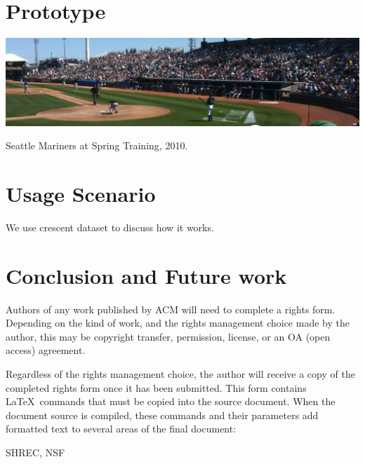 \documentclass[manuscript,screen]{acmart}
\begin{document}
\section{Prototype}

\begin{teaserfigure}
  \includegraphics[width=\textwidth]{sampleteaser}
  \caption{Seattle Mariners at Spring Training, 2010.}
  \label{fig:teaser}
\end{teaserfigure}





\section{Usage Scenario}

We use crescent dataset to discuss how it works. 




\section{Conclusion and Future work}

Authors of any work published by ACM will need to complete a rights
form. Depending on the kind of work, and the rights management choice
made by the author, this may be copyright transfer, permission,
license, or an OA (open access) agreement.

Regardless of the rights management choice, the author will receive a
copy of the completed rights form once it has been submitted. This
form contains \LaTeX\ commands that must be copied into the source
document. When the document source is compiled, these commands and
their parameters add formatted text to several areas of the final
document:



\begin{acks}
SHREC, NSF
\end{acks}
\end{document}
